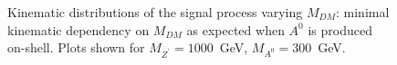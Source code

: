 \begin{figure}[h!]
	\centering
	\hfill
	\caption{Kinematic distributions of the signal process varying $M_{DM}$: minimal kinematic dependency on $M_{DM}$ as expected when $A^0$ is produced on-shell. Plots shown for $M_{Z^\prime}=1000$~GeV, $M_{A^0}=300$~GeV.}
	\label{fig:DMH_mdm}
\end{figure}
 
